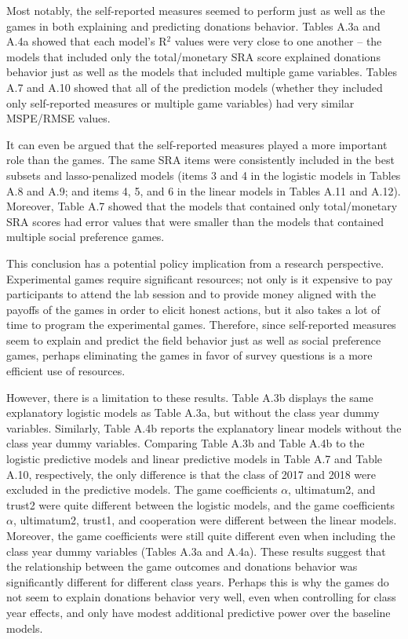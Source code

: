 \documentclass[12pt]{article}
\begin{document}
Most notably, the self-reported measures seemed to perform just as well as the games in both explaining and predicting donations behavior. Tables A.3a and A.4a showed that each model\rq s R$^{2}$ values were very close to one another -- the models that included only the total/monetary SRA score explained donations behavior just as well as the models that included multiple game variables. Tables A.7 and A.10 showed that all of the prediction models (whether they included only self-reported measures or multiple game variables) had very similar MSPE/RMSE values.

It can even be argued that the self-reported measures played a more important role than the games. The same SRA items were consistently included in the best subsets and lasso-penalized models (items 3 and 4 in the logistic models in Tables A.8 and A.9; and items 4, 5, and 6 in the linear models in Tables A.11 and A.12). Moreover, Table A.7 showed that the models that contained only total/monetary SRA scores had error values that were smaller than the models that contained multiple social preference games.

This conclusion has a potential policy implication from a research perspective. Experimental games require significant resources; not only is it expensive to pay participants to attend the lab session and to provide money aligned with the payoffs of the games in order to elicit honest actions, but it also takes a lot of time to program the experimental games. Therefore, since self-reported measures seem to explain and predict the field behavior just as well as social preference games, perhaps eliminating the games in favor of survey questions is a more efficient use of resources.

However, there is a limitation to these results. Table A.3b displays the same explanatory logistic models as Table A.3a, but without the class year dummy variables. Similarly, Table A.4b reports the explanatory linear models without the class year dummy variables. Comparing Table A.3b and Table A.4b to the logistic predictive models and linear predictive models in Table A.7 and Table A.10, respectively, the only difference is that the class of 2017 and 2018 were excluded in the predictive models. The game coefficients \(\alpha\), ultimatum2, and trust2 were quite different between the logistic models, and the game coefficients \(\alpha\), ultimatum2, trust1, and cooperation were different between the linear models. Moreover, the game coefficients were still quite different even when including the class year dummy variables (Tables A.3a and A.4a). These results suggest that the relationship between the game outcomes and donations behavior was significantly different for different class years. Perhaps this is why the games do not seem to explain donations behavior very well, even when controlling for class year effects, and only have modest additional predictive power over the baseline models.
\end{document}
